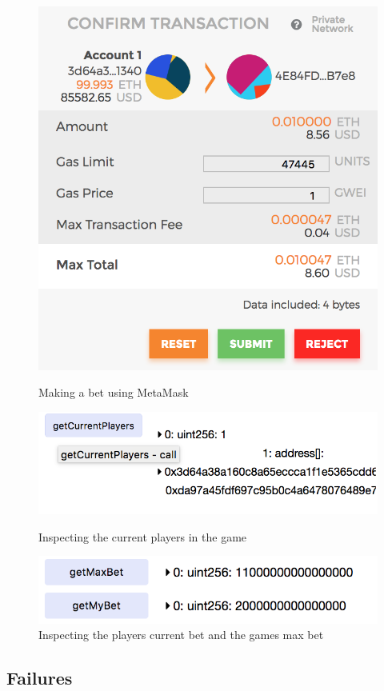 \begin{figure}[!htb]
  \includegraphics[width=\linewidth]{makebet}
  \caption{Making a bet using MetaMask}
\endminipage\hfill
{}
  \includegraphics[width=\linewidth]{getplayers}
  \caption{Inspecting the current players in the game}
  \bigskip
  \includegraphics[width=\linewidth]{getbet}
  \caption{Inspecting the players current bet and the games max bet}
\endminipage\hfill
\end{figure}

\subsection{Failures}


